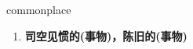 
\begin{frame}
{\huge commonplace}
\begin{center}
\begin{enumerate}\Large
  \item \textbf{司空见惯的(事物)，陈旧的(事物)}
\end{enumerate}
\end{center}
\end{frame}
